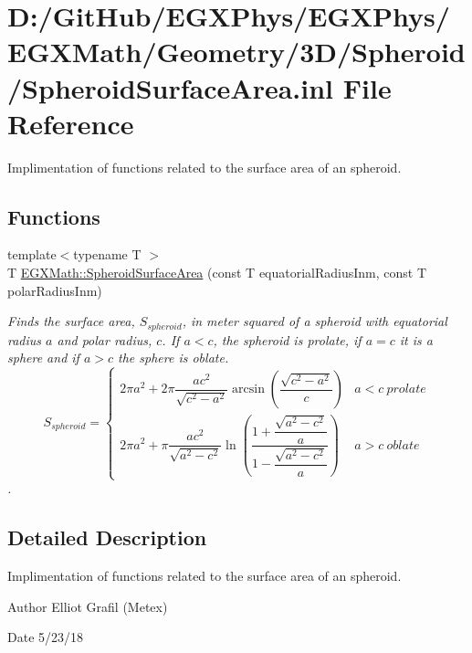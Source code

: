 \hypertarget{_spheroid_surface_area_8inl}{}\section{D\+:/\+Git\+Hub/\+E\+G\+X\+Phys/\+E\+G\+X\+Phys/\+E\+G\+X\+Math/\+Geometry/3\+D/\+Spheroid/\+Spheroid\+Surface\+Area.inl File Reference}
\label{_spheroid_surface_area_8inl}


Implimentation of functions related to the surface area of an spheroid.  


\subsection*{Functions}
\begin{DoxyCompactItemize}
\item 
{\footnotesize template$<$typename T $>$ }\\T \mbox{\hyperlink{group___e_g_x_math-_geometry-3_d-_spheroid-_surface_area_ga5a3580e7ded82cb678a558905f41ae49}{E\+G\+X\+Math\+::\+Spheroid\+Surface\+Area}} (const T equatorial\+Radius\+Inm, const T polar\+Radius\+Inm)
\begin{DoxyCompactList}\small\item\em Finds the surface area, $S_{spheroid}$, in meter squared of a spheroid with equatorial radius $a$ and polar radius, $c$. If $a < c$, the spheroid is prolate, if $a = c$ it is a sphere and if $a>c$ the sphere is oblate. \[ S_{spheroid}=\begin{cases} 2\pi a^2 + 2\pi\dfrac{a c^2}{\sqrt{c^2-a^2}}\arcsin \left ( \dfrac{\sqrt{c^2-a^2}}{c} \right ) & a<c\ prolate \\ 2\pi a^2 +\pi \dfrac{a c^2}{\sqrt{a^2-c^2}}\ln \left(\dfrac{1+\dfrac{\sqrt{a^2-c^2}}{a}}{1-\dfrac{\sqrt{a^2-c^2}}{a}}\right )& a>c\ oblate \end{cases} \]. \end{DoxyCompactList}\end{DoxyCompactItemize}


\subsection{Detailed Description}
Implimentation of functions related to the surface area of an spheroid. 

\begin{DoxyAuthor}{Author}
Elliot Grafil (Metex) 
\end{DoxyAuthor}
\begin{DoxyDate}{Date}
5/23/18 
\end{DoxyDate}
